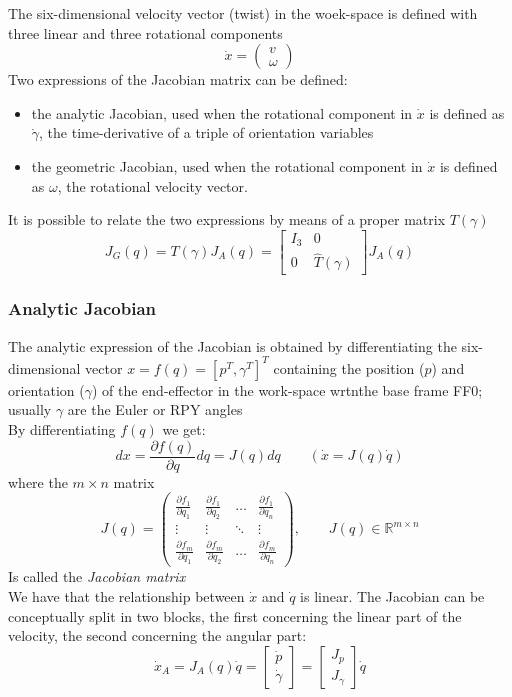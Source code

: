 \documentclass{book}
\begin{document}
The six-dimensional velocity vector (twist) in the woek-space is defined with three linear and three rotational components
\[
    \dot{x}=\begin{pmatrix} v \\ \omega \end{pmatrix}
\]
Two expressions of the Jacobian matrix can be defined:
\begin{itemize}
    \item the analytic Jacobian, used when the rotational component in $\dot{x}$ is defined as $\dot{\gamma}$, the time-derivative of a triple of orientation variables
    \item the geometric Jacobian, used when the rotational component in $\dot{x}$ is defined as $\omega$, the rotational velocity vector.
\end{itemize}
It is possible to relate the two expressions by means of a proper matrix $T(\gamma)$
\[
    J_G(q)=T({\gamma})J_A(q)=\begin{bmatrix}
        I_3 & 0 \\
        0 & \hat{T}(\gamma)
    \end{bmatrix}
    J_A(q)
\]
\subsubsection{Analytic Jacobian}
The analytic expression of the Jacobian is obtained by differentiating the six-dimensional vector $x=f(q)=[p^T,\gamma^T]^T$ containing the position ($p$) and orientation ($\gamma$) of the end-effector in the work-space wrtnthe base frame FF0; usually $\gamma$ are the Euler or RPY angles\\
By differentiating $f(q)$ we get:
\[
    dx=\frac{\partial f(q)}{\partial q}dq=J(q)dq \qquad (\dot{x}=J(q)\dot{q})
\]
where the $m\times n$ matrix
\[
    J(q)=\begin{pmatrix}
        \frac{\partial f_1}{\partial q_1} & \frac{\partial f_1}{\partial q_2} & \dots & \frac{\partial f_1}{\partial q_n}\\
        \vdots & \vdots &\ddots & \vdots \\
        \frac{\partial f_m}{\partial q_1} & \frac{\partial f_m}{\partial q_2} & \dots & \frac{\partial f_m}{\partial q_n}
    \end{pmatrix}, \qquad J(q) \in \mathbb{R}^{m\times n}
\]
Is called the \emph{Jacobian matrix}\\
We have that the relationship between $\dot{x}$ and $\dot{q}$ is linear.
The Jacobian can be conceptually split in two blocks, the first concerning the linear part of the velocity, the second concerning the angular part:
\[
    \dot{x}_A=J_A(q)\dot{q} = \begin{bmatrix} \dot{p} \\ \dot{\gamma} \end{bmatrix} = \begin{bmatrix} J_p \\ J_{\gamma} \end{bmatrix} \dot{q}
\]
\end{document}
